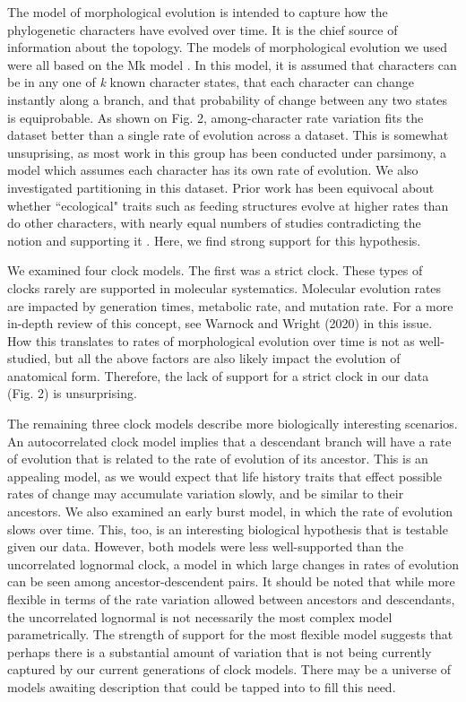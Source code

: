 \documentclass{article}
\begin{document}
The model of morphological evolution is intended to capture how the phylogenetic characters have evolved over time.
It is the chief source of information about the topology.
The models of morphological evolution we used were all based on the Mk model \citep{Lewis2001}. 
In this model, it is assumed that characters can be in any one of \textit{k} known character states, that each character can change instantly along a branch, and that probability of change between any two states is equiprobable.
As shown on Fig. 2, among-character rate variation fits the dataset better than a single rate of evolution across a dataset.
This is somewhat unsuprising, as most work in this group has been conducted under parsimony, a model which assumes each character has its own rate of evolution.
We also investigated partitioning in this dataset.
Prior work has been equivocal about whether ``ecological" traits such as feeding structures evolve at higher rates than do other characters, with nearly equal numbers of studies contradicting the notion \citep{Foote1994,Sanchez-Villagra1998,Ciampaglio2002} and supporting it \citep{Wagner1995,Blomberg2003,HopkinsSmith2015}.
Here, we find strong support for this hypothesis.

We examined four clock models.
The first was a strict clock. 
These types of clocks rarely are supported in molecular systematics.
Molecular evolution rates are impacted by generation times,  metabolic rate, and mutation rate.
For a more in-depth review of this concept, see Warnock and Wright (2020) in this issue. %
How this translates to rates of morphological evolution over time is not as well-studied, but all the above factors are also likely impact the evolution of anatomical form. %
Therefore, the lack of support for a strict clock in our data (Fig. 2) is unsurprising.

The remaining three clock models describe more biologically interesting scenarios.
An autocorrelated clock model implies that a descendant branch will have a rate of evolution that is related to the rate of evolution of its ancestor.
This is an appealing model, as we would expect that life history traits that effect possible rates of change may accumulate variation slowly, and be similar to their ancestors. 
We also examined an early burst model, in which the rate of evolution slows over time.
This, too, is an interesting biological hypothesis that is testable given our data.
However, both models were less well-supported than the uncorrelated lognormal clock,
a model in which large changes in rates of evolution can be seen among ancestor-descendent pairs.
It should be noted that while more flexible in terms of the rate variation allowed between ancestors and descendants, the uncorrelated lognormal is not necessarily the most complex model parametrically. 
The strength of support for the most flexible model suggests that perhaps there is a substantial amount of variation that is not being currently captured by our current generations of clock models.
There may be a universe of models awaiting description that could be tapped into to fill this need.
\end{document}
